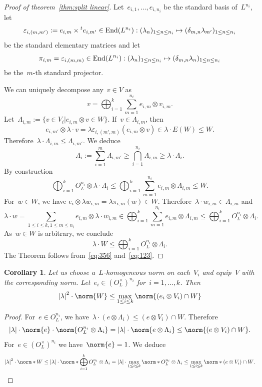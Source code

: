 \documentclass[12pt]{amsart}
\newtheorem{corollary}[theorem]{Corollary}
\newcommand{\End}{{\rm End}}
\newcommand{\eps}{{\varepsilon}}
\newcommand{\tens}{\otimes}
\newcommand{\abs}[1]{\left|#1\right|}
\begin{document}
\begin{proof}[Proof of theorem~\ref{thm:split linear}]
Let~$e_{i,1},\ldots,e_{i,n_i}$ be the standard basis of~${L}^{n_i}$, let
\[
\eps_{i,(m,m')}:= e_{i,m}\times {}^te_{i,m'}\in \End(L^{n_i}):(\lambda_n)_{1\leq n\leq n_i}\mapsto (\delta_{m,n} \lambda_{m'})_{1\leq n\leq n_i}
\]
be the standard elementary matrices and let~
\[
\pi_{i,m}=\eps_{i,(m,m)}\in \End(L^{n_i}):(\lambda_n)_{1\leq n\leq n_i}\mapsto (\delta_{m,n} \lambda_n)_{1\leq n\leq n_i}
\]
be the~$m$-th standard projector.

We can uniquely decompose any~$v\in V$ as
\[
v=\bigoplus_{i=1}^k \sum^{n_i}_{m=1} e_{i,m}\tens v_{i,m}.
\]
Let~$\Lambda_{i,m}:=\{v\in V_i|e_{i,m}\tens v\in W\}$. If~$v\in \Lambda_{i,m}$,
then
\[
e_{i,m'}\tens \lambda \cdot v = \lambda \eps_{i,(m',m)}(e_{i,m}\tens v)\in \lambda\cdot E(W)\leq W.
\]
Therefore~$\lambda\cdot \Lambda_{i,m}\leq \Lambda_{i,m'}$. We deduce
\[
\Lambda_i:=\sum_{i=1}^{m}\Lambda_{i,m'}\geq \bigcap_{i=1}^{n_i} \Lambda_{i,m}\geq \lambda\cdot \Lambda_i.
\]
By construction
\begin{equation}\label{eq:356}
\bigoplus_{i=1}^k O_L^{n_i}\tens \lambda\cdot \Lambda_i
\leq 
\bigoplus_{i=1}^k \sum^{n_i}_{m=1} e_{i,m}\tens \Lambda_{i,m}
\leq W.
\end{equation}
For~$w\in W$, we have
\(
e_i\tens \lambda w_{i,m}=\lambda \pi_{i,m}(w)\in W.
\)
Therefore~$\lambda\cdot w_{i,m}\in \Lambda_{i,m}$ and
\[
\lambda\cdot w=\sum_{1\leq i\leq k,1\leq m\leq n_i}e_{i,m}\tens \lambda\cdot w_{i,m}\in 
\bigoplus_{i=1}^k \sum^{n_i}_{m=1} e_{i,m}\tens \Lambda_{i,m}\leq \bigoplus_{i=1}^k O_L^{n_i}\tens \Lambda_i.
\]
As~$w\in W$ is arbitrary, we conclude
\begin{equation}\label{eq:123}
\lambda\cdot W\leq \bigoplus_{i=1}^k O_L^{n_i}\tens \Lambda_i.
\end{equation}
The Theorem follows from~\eqref{eq:356} and~\eqref{eq:123}.
\end{proof}
\begin{corollary}Let us choose a~$L$-homogeneous norm on each~$V_i$ and equip~$V$ with the corresponding norm. 
Let~$e_i\in (O^\times_L)^{n_i}$ for~$i=1,\ldots,k$. Then
\[
\abs{\lambda}^2\cdot \norm{W}\leq \max_{1\leq i\leq k}\norm{(e_i\tens V_i)\cap W}
\]
\end{corollary}
\begin{proof}For~$e\in O_L^{n_i}$, we have~$\lambda\cdot (e\tens \Lambda_i)\leq (e\tens V_i)\cap W$. Therefore
\[
\abs{\lambda}\cdot \norm{e}\cdot \norm{O_L^{n_i}\tens\Lambda_i}=
\abs{\lambda}\cdot \norm{e\tens \Lambda_i}\leq \norm{(e\tens V_i)\cap W}.
\]
For~$e\in (O_L^\times)^{n_i}$ we have~$\norm{e}=1$.
We deduce
\[
\abs{\lambda}^2 \cdot \norm*{W}\leq \abs{\lambda}\cdot \norm*{\bigoplus_{i=1}^k O_L^{n_i}\tens \Lambda_i}=
\abs{\lambda}\cdot \max_{1\leq i \leq k}\norm*{O_L^{n_i}\tens \Lambda_i}\leq 
\max_{1\leq i \leq k}\norm*{(e\tens V_i)\cap W}.
\]
\end{proof}
\end{document}
